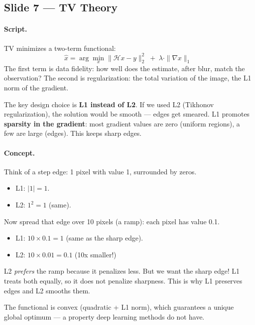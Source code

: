 \documentclass[english,11pt,a4paper]{article}
\begin{document}
\subsection{Slide 7 --- TV Theory}

\paragraph{Script.}
TV minimizes a two-term functional:
\[
\hat{x} = \arg\min_x \|\mathcal{H}x - y\|_2^2 \;+\; \lambda \cdot \|\nabla x\|_1
\]
The first term is data fidelity: how well does the estimate, after blur,
match the observation? The second is regularization: the total variation
of the image, the L1 norm of the gradient.

The key design choice is \textbf{L1 instead of L2}. If we used L2
(Tikhonov regularization), the solution would be smooth --- edges get
smeared. L1 promotes \textbf{sparsity in the gradient}: most gradient
values are zero (uniform regions), a few are large (edges). This keeps
sharp edges.

\paragraph{Concept.}
Think of a step edge: 1 pixel with value 1, surrounded by zeros.
\begin{itemize}
\item L1: $|1| = 1$.
\item L2: $1^2 = 1$ (same).
\end{itemize}
Now spread that edge over 10 pixels (a ramp): each pixel has value 0.1.
\begin{itemize}
\item L1: $10 \times 0.1 = 1$ (same as the sharp edge).
\item L2: $10 \times 0.01 = 0.1$ (10x smaller!)
\end{itemize}
L2 \textit{prefers} the ramp because it penalizes less. But we want
the sharp edge! L1 treats both equally, so it does not penalize
sharpness. This is why L1 preserves edges and L2 smooths them.

The functional is convex (quadratic + L1 norm), which guarantees a
unique global optimum --- a property deep learning methods do not have.
\end{document}

